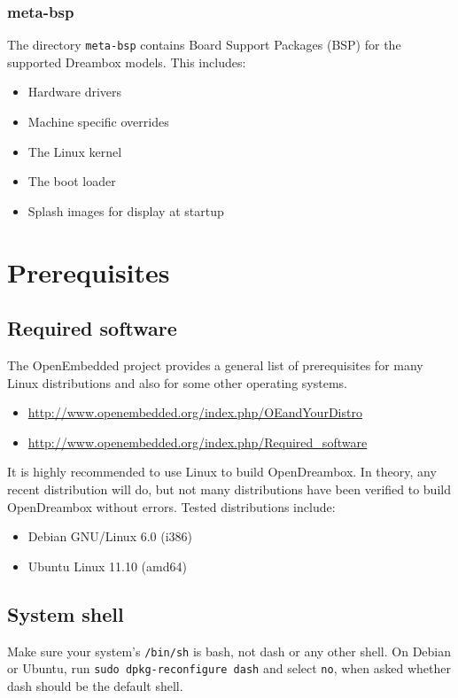 \documentclass[a4paper]{article}
\newcommand{\shell}[1]{\texttt{\small #1}}
\begin{document}
    \subsubsection{meta-bsp}
      The directory \shell{meta-bsp} contains Board Support Packages (BSP)
      for the supported Dreambox models. This includes:

      \begin{itemize}
        \item Hardware drivers
        \item Machine specific overrides
        \item The Linux kernel
        \item The boot loader
        \item Splash images for display at startup
      \end{itemize}

\section{Prerequisites}

  \subsection{Required software}

   The OpenEmbedded project provides a general list of prerequisites for
   many Linux distributions and also for some other operating systems.

   \begin{itemize}
     \item \url{http://www.openembedded.org/index.php/OEandYourDistro}
     \item \url{http://www.openembedded.org/index.php/Required\_software}
   \end{itemize}

   It is highly recommended to use Linux to build OpenDreambox. In theory,
   any recent distribution will do, but not many distributions have been
   verified to build OpenDreambox without errors. Tested distributions include:

   \begin{itemize}
     \item Debian GNU/Linux 6.0 (i386)
     \item Ubuntu Linux 11.10 (amd64)
   \end{itemize}

  \subsection{System shell}
    Make sure your system's \shell{/bin/sh} is bash, not dash or any other
    shell. On Debian or Ubuntu, run \shell{sudo dpkg-reconfigure dash} and
    select \shell{no}, when asked whether dash should be the default shell.
\end{document}
